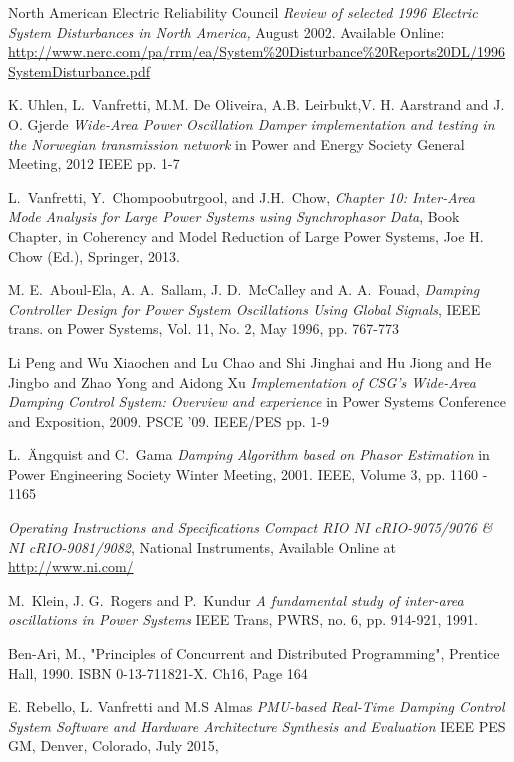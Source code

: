 \documentclass[conference]{IEEEtran}
\begin{document}
\begin{thebibliography}{1}

 North American Electric Reliability Council \emph{Review of selected 1996 Electric System Disturbances in North America,} August 2002. Available Online: \url{http://www.nerc.com/pa/rrm/ea/System\%20Disturbance\%20Reports20DL/1996SystemDisturbance.pdf}

 K. Uhlen, L.~Vanfretti, M.M. De Oliveira, A.B. Leirbukt,V. H. Aarstrand and J. O. Gjerde \emph{Wide-Area Power Oscillation Damper implementation and testing in the Norwegian transmission network} in Power and Energy Society General Meeting, 2012 IEEE pp. 1-7

  L.~Vanfretti, Y.~Chompoobutrgool, and J.H.~Chow, \emph{Chapter 10: Inter-Area Mode Analysis for Large Power Systems using Synchrophasor Data}, Book Chapter, in Coherency and Model Reduction of Large Power Systems, Joe H. Chow (Ed.), Springer, 2013.

  M. E.~Aboul-Ela, A. A.~Sallam, J. D.~McCalley and A. A.~Fouad, \emph{Damping Controller Design for Power System Oscillations Using Global Signals}, IEEE trans. on Power Systems, Vol. 11, No. 2, May 1996, pp. 767-773

 Li Peng and Wu Xiaochen and Lu Chao and Shi Jinghai and Hu Jiong and He Jingbo and Zhao Yong and Aidong Xu \emph{Implementation of CSG's Wide-Area Damping Control System: Overview and experience} in Power Systems Conference and Exposition, 2009. PSCE '09. IEEE/PES pp. 1-9

 L.~\"{A}ngquist and C.~Gama  \emph{Damping Algorithm based on Phasor Estimation} in Power Engineering Society Winter Meeting, 2001. IEEE, Volume 3, pp. 1160 - 1165

 \emph{Operating Instructions and Specifications Compact RIO NI cRIO-9075/9076 \& NI cRIO-9081/9082}, National Instruments, Available Online at \url{http://www.ni.com/}

 M.~Klein, J. G.~Rogers and P.~Kundur \emph{A fundamental study of inter-area oscillations in Power Systems} IEEE Trans, PWRS, no. 6, pp. 914-921, 1991.

 Ben-Ari, M., "Principles of Concurrent and Distributed Programming", Prentice Hall, 1990. ISBN 0-13-711821-X. Ch16, Page 164

 E. Rebello, L. Vanfretti and M.S Almas \emph{PMU-based Real-Time Damping Control System Software and Hardware Architecture Synthesis and Evaluation} IEEE PES GM, Denver, Colorado, July 2015,


\end{thebibliography}
\end{document}
